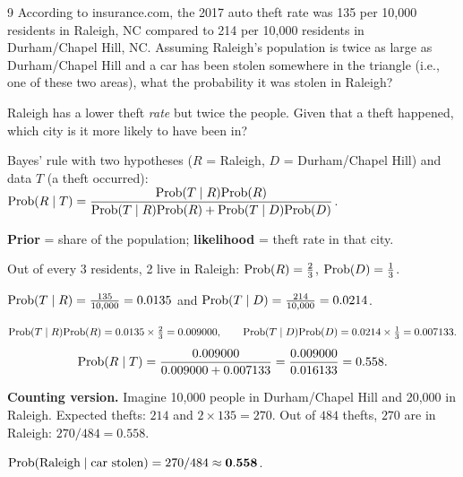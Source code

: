 \documentclass[11pt]{article}
\begin{document}

\begin{problem}{9}
According to insurance.com, the 2017 auto theft rate was 135 per 10,000 residents in Raleigh, NC compared to 214 per 10,000 residents in Durham/Chapel Hill, NC. Assuming Raleigh's population is twice as large as Durham/Chapel Hill and a car has been stolen somewhere in the triangle (i.e., one of these two areas), what the probability it was stolen in Raleigh?
\end{problem}

\begin{restate}
Raleigh has a lower theft \emph{rate} but twice the people. Given that a theft happened, which city is it more likely to have been in?
\end{restate}

\begin{recall}
Bayes' rule with two hypotheses ($R$ = Raleigh, $D$ = Durham/Chapel Hill) and data $T$ (a theft occurred):
$\mathrm{Prob}(R\mid T)=\dfrac{\mathrm{Prob}(T\mid R)\mathrm{Prob}(R)}{\mathrm{Prob}(T\mid R)\mathrm{Prob}(R)+\mathrm{Prob}(T\mid D)\mathrm{Prob}(D)}$.
\end{recall}

\begin{keyidea}
\textbf{Prior} = share of the population; \textbf{likelihood} = theft rate in that city.
\end{keyidea}

\solution
{} Out of every 3 residents, 2 live in Raleigh: $\mathrm{Prob}(R)=\frac23$, $\mathrm{Prob}(D)=\frac13$.

 $\mathrm{Prob}(T\mid R)=\frac{135}{10{,}000}=0.0135$ and $\mathrm{Prob}(T\mid D)=\frac{214}{10{,}000}=0.0214$.

\[
\mathrm{Prob}(T\mid R)\mathrm{Prob}(R)=0.0135\times\tfrac23=0.009000,\qquad\mathrm{Prob}(T\mid D)\mathrm{Prob}(D)=0.0214\times\tfrac13=0.007133.
\]
\[
\mathrm{Prob}(R\mid T)=\frac{0.009000}{0.009000+0.007133}=\frac{0.009000}{0.016133}=0.558.
\]

\begin{sanity}
\textbf{Counting version.} Imagine 10{,}000 people in Durham/Chapel Hill and 20{,}000 in Raleigh. Expected thefts: $214$ and $2\times135=270$. Out of $484$ thefts, $270$ are in Raleigh: $270/484=0.558$. \checkmark
\end{sanity}

\begin{answer}
$\mathrm{Prob}(\text{Raleigh}\mid\text{car stolen})=270/484\approx\mathbf{0.558}$.
\end{answer}
\end{document}
